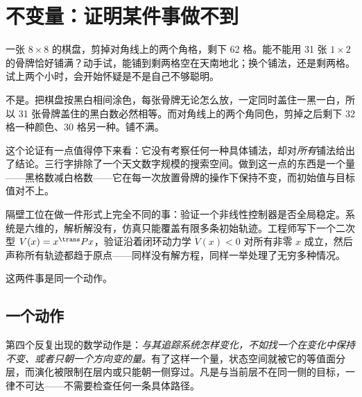 \section{不变量：证明某件事做不到}
\label{sec:17-Synthesis/02-Recurring-Ideas/04}

一张 \(8\times 8\) 的棋盘，剪掉对角线上的两个角格，剩下 62 格。能不能用 31 张 \(1\times 2\) 的骨牌恰好铺满？动手试，能铺到剩两格空在天南地北；换个铺法，还是剩两格。试上两个小时，会开始怀疑是不是自己不够聪明。

不是。把棋盘按黑白相间涂色，每张骨牌无论怎么放，一定同时盖住一黑一白，所以 31 张骨牌盖住的黑白数必然相等。而对角线上的两个角同色，剪掉之后剩下 32 格一种颜色、30 格另一种。铺不满。

这个论证有一点值得停下来看：它没有考察任何一种具体铺法，却对\emph{所有}铺法给出了结论。三行字排除了一个天文数字规模的搜索空间。做到这一点的东西是一个量——黑格数减白格数——它在每一次放置骨牌的操作下保持不变，而初始值与目标值对不上。

隔壁工位在做一件形式上完全不同的事：验证一个非线性控制器是否全局稳定。系统是六维的，解析解没有，仿真只能覆盖有限多条初始轨迹。工程师写下一个二次型 \(V(x)=x^{\trans}Px\)，验证沿着闭环动力学 \(\dot V(x)<0\) 对所有非零 \(x\) 成立，然后声称所有轨迹都趋于原点——同样没有解方程，同样一举处理了无穷多种情况。

这两件事是同一个动作。

\subsection{一个动作}

第四个反复出现的数学动作是：\emph{与其追踪系统怎样变化，不如找一个在变化中保持不变、或者只朝一个方向变的量。}有了这样一个量，状态空间就被它的等值面分层，而演化被限制在层内或只能朝一侧穿过。凡是与当前层不在同一侧的目标，一律不可达——不需要检查任何一条具体路径。

